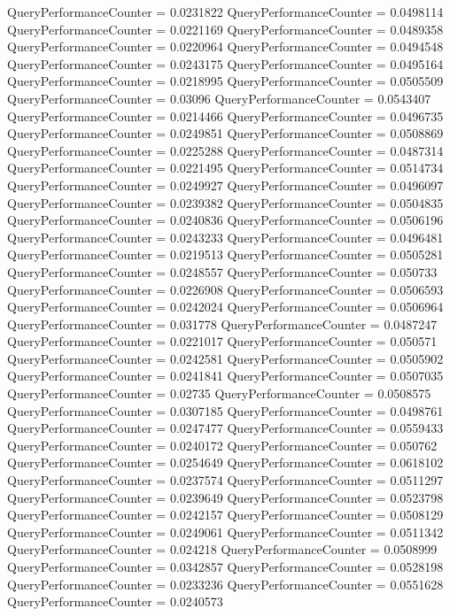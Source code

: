 \documentclass[9pt]{article}
\theoremstyle{plain}
\theoremstyle{definition}
\theoremstyle{remark}
\numberwithin{equation}{section}
\begin{document}
QueryPerformanceCounter  =  0.0231822
QueryPerformanceCounter  =  0.0498114
QueryPerformanceCounter  =  0.0221169
QueryPerformanceCounter  =  0.0489358
QueryPerformanceCounter  =  0.0220964
QueryPerformanceCounter  =  0.0494548
QueryPerformanceCounter  =  0.0243175
QueryPerformanceCounter  =  0.0495164
QueryPerformanceCounter  =  0.0218995
QueryPerformanceCounter  =  0.0505509
QueryPerformanceCounter  =  0.03096
QueryPerformanceCounter  =  0.0543407
QueryPerformanceCounter  =  0.0214466
QueryPerformanceCounter  =  0.0496735
QueryPerformanceCounter  =  0.0249851
QueryPerformanceCounter  =  0.0508869
QueryPerformanceCounter  =  0.0225288
QueryPerformanceCounter  =  0.0487314
QueryPerformanceCounter  =  0.0221495
QueryPerformanceCounter  =  0.0514734
QueryPerformanceCounter  =  0.0249927
QueryPerformanceCounter  =  0.0496097
QueryPerformanceCounter  =  0.0239382
QueryPerformanceCounter  =  0.0504835
QueryPerformanceCounter  =  0.0240836
QueryPerformanceCounter  =  0.0506196
QueryPerformanceCounter  =  0.0243233
QueryPerformanceCounter  =  0.0496481
QueryPerformanceCounter  =  0.0219513
QueryPerformanceCounter  =  0.0505281
QueryPerformanceCounter  =  0.0248557
QueryPerformanceCounter  =  0.050733
QueryPerformanceCounter  =  0.0226908
QueryPerformanceCounter  =  0.0506593
QueryPerformanceCounter  =  0.0242024
QueryPerformanceCounter  =  0.0506964
QueryPerformanceCounter  =  0.031778
QueryPerformanceCounter  =  0.0487247
QueryPerformanceCounter  =  0.0221017
QueryPerformanceCounter  =  0.050571
QueryPerformanceCounter  =  0.0242581
QueryPerformanceCounter  =  0.0505902
QueryPerformanceCounter  =  0.0241841
QueryPerformanceCounter  =  0.0507035
QueryPerformanceCounter  =  0.02735
QueryPerformanceCounter  =  0.0508575
QueryPerformanceCounter  =  0.0307185
QueryPerformanceCounter  =  0.0498761
QueryPerformanceCounter  =  0.0247477
QueryPerformanceCounter  =  0.0559433
QueryPerformanceCounter  =  0.0240172
QueryPerformanceCounter  =  0.050762
QueryPerformanceCounter  =  0.0254649
QueryPerformanceCounter  =  0.0618102
QueryPerformanceCounter  =  0.0237574
QueryPerformanceCounter  =  0.0511297
QueryPerformanceCounter  =  0.0239649
QueryPerformanceCounter  =  0.0523798
QueryPerformanceCounter  =  0.0242157
QueryPerformanceCounter  =  0.0508129
QueryPerformanceCounter  =  0.0249061
QueryPerformanceCounter  =  0.0511342
QueryPerformanceCounter  =  0.024218
QueryPerformanceCounter  =  0.0508999
QueryPerformanceCounter  =  0.0342857
QueryPerformanceCounter  =  0.0528198
QueryPerformanceCounter  =  0.0233236
QueryPerformanceCounter  =  0.0551628
QueryPerformanceCounter  =  0.0240573
\end{document}
